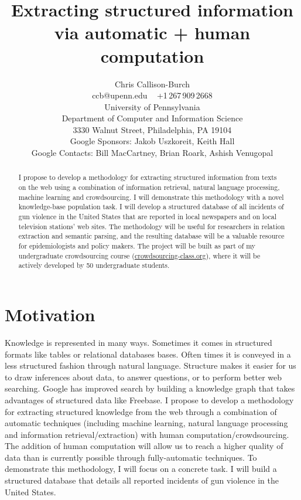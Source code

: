\documentclass[11pt]{article}
\title{Extracting structured information via automatic + human computation}
\author{Chris Callison-Burch \\
 ccb@upenn.edu ~ +1\,267\,909\,2668 \\
 University of Pennsylvania \\
 Department of Computer and Information Science \\
 3330 Walnut Street, Philadelphia, PA 19104 \\
 Google Sponsors: Jakob Uszkoreit, Keith Hall  \\
 Google Contacts: Bill MacCartney, Brian Roark, Ashish Venugopal}
\date{}
\begin{document}
\maketitle

\begin{abstract}
I propose to develop a methodology for extracting structured information from texts on the web using a combination of information retrieval, natural language processing, machine learning and crowdsourcing.  I will demonstrate this methodology with a novel knowledge-base population task.  I will develop a structured database of all incidents of gun violence in the United States that are reported in local newspapers and on local television stations' web sites. The methodology will be useful for researchers in relation extraction and semantic parsing, and the resulting database will be a valuable resource for epidemiologists and policy makers. 
The project will be built as part of my undergraduate crowdsourcing course (\url{crowdsourcing-class.org}), where it will be actively developed by 50 undergraduate students.  
\end{abstract}

\section{Motivation}

Knowledge is represented in many ways.  Sometimes it comes in structured formats like tables or relational databases bases.  Often times it is conveyed in a less structured fashion through natural language.  Structure makes it easier for us to draw inferences about data, to answer questions, or to perform better web searching.  Google has improved search by building a knowledge graph that takes advantages of structured data like Freebase.  I propose to develop a methodology for extracting structured knowledge from the web through a combination of automatic techniques (including machine learning, natural language processing and information retrieval/extraction) with human computation/crowdsourcing.  The addition of human computation will allow us to reach a higher quality of data than is currently possible through fully-automatic techniques. To demonstrate this methodology, I will focus on a concrete task.  I will build a structured database that details all reported incidents of gun violence in the United States.  
\end{document}
